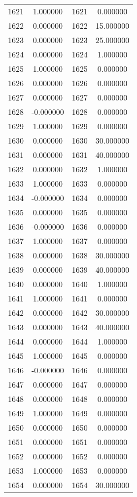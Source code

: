 \documentclass[12pt]{article}
\begin{document}
\begin{longtable}{@{}cccc@{}}
1621 & 1.000000 & 1621 & 0.000000 \\
1622 & 0.000000 & 1622 & 15.000000 \\
1623 & 0.000000 & 1623 & 25.000000 \\
1624 & 0.000000 & 1624 & 1.000000 \\
1625 & 1.000000 & 1625 & 0.000000 \\
1626 & 0.000000 & 1626 & 0.000000 \\
1627 & 0.000000 & 1627 & 0.000000 \\
1628 & -0.000000 & 1628 & 0.000000 \\
1629 & 1.000000 & 1629 & 0.000000 \\
1630 & 0.000000 & 1630 & 30.000000 \\
1631 & 0.000000 & 1631 & 40.000000 \\
1632 & 0.000000 & 1632 & 1.000000 \\
1633 & 1.000000 & 1633 & 0.000000 \\
1634 & -0.000000 & 1634 & 0.000000 \\
1635 & 0.000000 & 1635 & 0.000000 \\
1636 & -0.000000 & 1636 & 0.000000 \\
1637 & 1.000000 & 1637 & 0.000000 \\
1638 & 0.000000 & 1638 & 30.000000 \\
1639 & 0.000000 & 1639 & 40.000000 \\
1640 & 0.000000 & 1640 & 1.000000 \\
1641 & 1.000000 & 1641 & 0.000000 \\
1642 & 0.000000 & 1642 & 30.000000 \\
1643 & 0.000000 & 1643 & 40.000000 \\
1644 & 0.000000 & 1644 & 1.000000 \\
1645 & 1.000000 & 1645 & 0.000000 \\
1646 & -0.000000 & 1646 & 0.000000 \\
1647 & 0.000000 & 1647 & 0.000000 \\
1648 & 0.000000 & 1648 & 0.000000 \\
1649 & 1.000000 & 1649 & 0.000000 \\
1650 & 0.000000 & 1650 & 0.000000 \\
1651 & 0.000000 & 1651 & 0.000000 \\
1652 & 0.000000 & 1652 & 0.000000 \\
1653 & 1.000000 & 1653 & 0.000000 \\
1654 & 0.000000 & 1654 & 30.000000 \\

\end{longtable}
\end{document}
